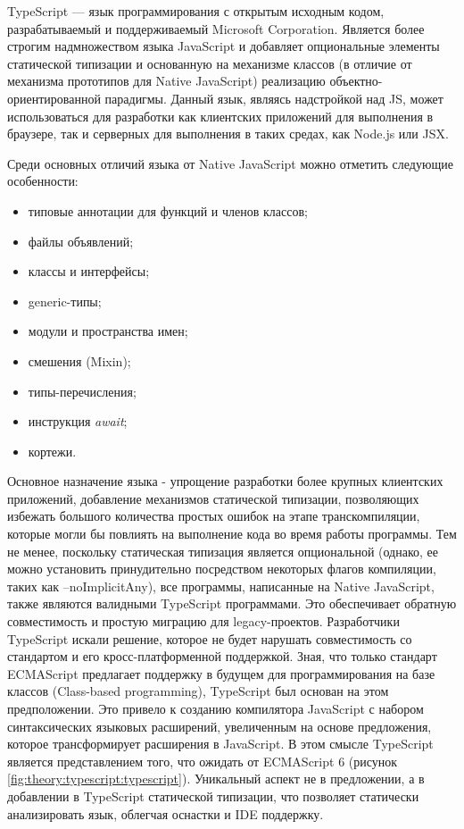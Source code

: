 
TypeScript --- язык программирования с открытым исходным кодом, разрабатываемый и поддерживаемый Microsoft Corporation. Является более строгим надмножеством языка JavaScript
и добавляет опциональные элементы статической типизации и основанную на механизме классов (в отличие от механизма прототипов для Native JavaScript) реализацию объектно-ориентированной парадигмы.
Данный язык, являясь надстройкой над JS, может использоваться для разработки как клиентских приложений для выполнения в браузере, так и серверных для выполнения в таких средах,
как Node.js или JSX. \cite{typescript1}\cite{typescript2}

Среди основных отличий языка от Native JavaScript можно отметить следующие особенности:
\begin{itemize}
\item типовые аннотации для функций и членов классов;
\item файлы объявлений;
\item классы и интерфейсы;
\item generic-типы;
\item модули и пространства имен;
\item смешения (Mixin);
\item типы-перечисления;
\item инструкция \textit{await};
\item кортежи.
\end{itemize}

Основное назначение языка - упрощение разработки более крупных клиентских приложений, добавление механизмов статической типизации, позволяющих избежать большого количества
простых ошибок на этапе транскомпиляции, которые могли бы повлиять на выполнение кода во время работы программы. Тем не менее, поскольку статическая типизация является
опциональной (однако, ее можно установить принудительно посредством некоторых флагов компиляции, таких как --noImplicitAny), все программы, написанные на Native JavaScript,
также являются валидными TypeScript программами. Это обеспечивает обратную совместимость и простую миграцию для legacy-проектов. Разработчики TypeScript искали решение,
которое не будет нарушать совместимость со стандартом и его кросс-платформенной поддержкой. Зная, что только стандарт ECMAScript предлагает поддержку в будущем для
программирования на базе классов (Class-based programming), TypeScript был основан на этом предположении. Это привело к созданию компилятора JavaScript с набором
синтаксических языковых расширений, увеличенным на основе предложения, которое трансформирует расширения в JavaScript. В этом смысле TypeScript является представлением
того, что ожидать от ECMAScript 6 (рисунок \ref{fig:theory:typescript:typescript}). Уникальный аспект не в предложении, а в добавлении в TypeScript статической типизации,
что позволяет статически анализировать язык, облегчая оснастки и IDE поддержку.

